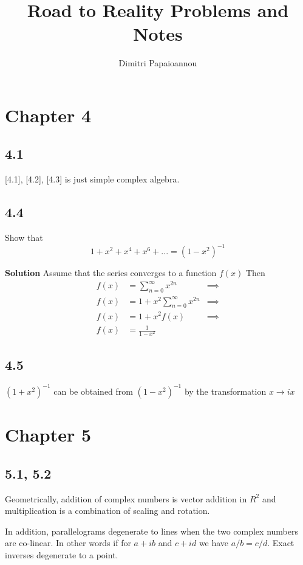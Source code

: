 \documentclass[]{article}
\title{Road to Reality Problems and Notes}
\author{Dimitri Papaioannou}
\begin{document}
\maketitle



\section*{Chapter 4}

\subsection*{4.1}

[4.1], [4.2], [4.3] is just simple complex algebra.



\subsection*{4.4}
Show that
$$
1+x^2+x^4+x^6+... = (1-x^2)^{-1}
$$

\textbf{Solution}
Assume that the series converges to a function $f(x)$
Then
\begin{eqnarray}
f(x) &= \sum_{n=0}^\infty x^{2n} &\implies \\
f(x) &= 1 + x^2\sum_{n=0}^\infty x^{2n} &\implies \\
f(x) &= 1+x^2f(x) &\implies \\
f(x) &= \frac{1}{1-x^2}
\end{eqnarray}


\subsection*{4.5}
$(1+x^2)^{-1}$ can be obtained from $(1-x^2)^{-1}$ by the transformation $x \rightarrow ix$

\section*{Chapter 5}

\subsection*{5.1, 5.2}
Geometrically, addition of complex numbers is vector addition in $R^2$ 
and multiplication is a combination of scaling and rotation.

In addition, parallelograms degenerate to lines when the two complex numbers are co-linear.
In other words if for $a+ib$ and $c+id$ we have $a/b = c/d$. Exact inverses degenerate to a point.
\end{document}
